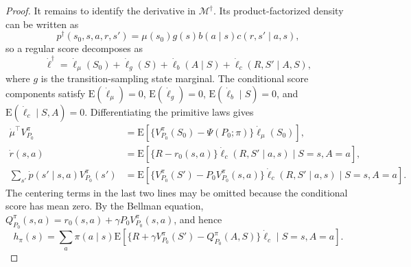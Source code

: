 \documentclass[12pt]{article}
\theoremstyle{remark}\newtheorem{remark}[theorem]{Remark}\theoremstyle{plain}
\newcommand{\E}{\mathrm{E}}
\begin{document}
\begin{proof}
    It remains to identify the derivative in
    $\mathcal M^\dagger$.  Its product-factorized density can be
    written as
    \[
        p^\dagger(s_0,s,a,r,s')
        =\mu(s_0)g(s)b(a\mid s)c(r,s'\mid a,s),
    \]
    so a regular score decomposes as
    \[
        \dot\ell^\dagger
        =\dot\ell_\mu(S_0)+\dot\ell_g(S)
        +\dot\ell_b(A\mid S)
        +\dot\ell_c(R,S'\mid A,S),
    \]
    where $g$ is the transition-sampling state marginal.  The
    conditional score components satisfy
    $\E(\dot\ell_\mu)=0$,
    $\E(\dot\ell_g)=0$,
    $\E(\dot\ell_b\mid S)=0$, and
    $\E(\dot\ell_c\mid S,A)=0$.
    Differentiating the primitive laws gives
    \[
        \begin{aligned}
        \dot\mu^\top V_{P_0}^\pi
        &=\E\!\left[
        \{V_{P_0}^\pi(S_0)-\Psi(P_0;\pi)\}
        \dot\ell_\mu(S_0)\right],\\
        \dot r(s,a)
        &=\E\!\left[
        \{R-r_0(s,a)\}\dot\ell_c(R,S'\mid a,s)
        \mid S=s,A=a\right],\\
        \sum_{s'}\dot p(s'\mid s,a)V_{P_0}^\pi(s')
        &=\E\!\left[
        \{V_{P_0}^\pi(S')
        -P_0V_{P_0}^\pi(s,a)\}
        \dot\ell_c(R,S'\mid a,s)
        \mid S=s,A=a\right].
        \end{aligned}
    \]
    The centering terms in the last two lines may be omitted because
    the conditional score has mean zero.  By the Bellman equation,
    $Q_{P_0}^\pi(s,a)
      =r_0(s,a)+\gamma P_0V_{P_0}^\pi(s,a)$, and hence
    \[
        h_\pi(s)
        =
        \sum_a\pi(a\mid s)
        \E\!\left[
        \{R+\gamma V_{P_0}^\pi(S')
        -Q_{P_0}^\pi(A,S)\}\dot\ell_c
        \mid S=s,A=a\right].
    \]


\end{proof}
\end{document}
